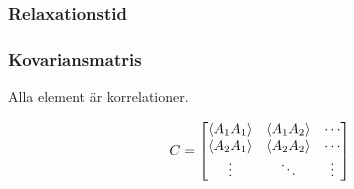 \documentclass[swedish]{beamer}
\begin{document}
\begin{frame}
\frametitle{Relaxationstid}

\begin{figure}
\resizebox{.8\textwidth}{!}{  }
\end{figure}

\end{frame}

\begin{frame}
\frametitle{Kovariansmatris}
Alla element är korrelationer. 

\[
C = 
\begin{bmatrix}
\ev{A_1 A_1} & \ev{A_1 A_2} & \cdots \\
\ev{A_2 A_1} & \ev{A_2 A_2} & \cdots \\
\vdots & \ddots & \vdots
\end{bmatrix}
\]

\end{frame}
\end{document}
